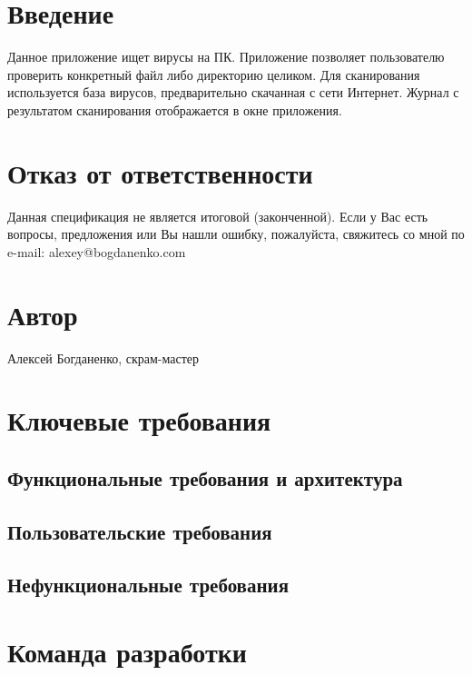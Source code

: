 \section{Введение}
Данное приложение ищет вирусы на ПК. Приложение позволяет пользователю проверить конкретный файл либо директорию целиком. Для сканирования используется база вирусов, предварительно скачанная с сети Интернет. Журнал с результатом сканирования отображается в окне приложения.
\section{Отказ от ответственности}
Данная спецификация не является итоговой (законченной). Если у Вас есть вопросы, предложения или Вы нашли ошибку, пожалуйста, свяжитесь со мной по e-mail: alexey@bogdanenko.com
\section{Автор}
Алексей Богданенко, скрам-мастер
\section{Ключевые требования}
\subsection{Функциональные требования и архитектура}
\subsection{Пользовательские требования}
\subsection{Нефункциональные требования}
\section{Команда разработки}
